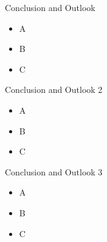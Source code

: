 \begin{frame}{Conclusion and Outlook}
    \begin{itemize}
        \item A
        \item B
        \item C
    \end{itemize}
\end{frame}

\begin{frame}{Conclusion and Outlook 2}
    \begin{itemize}
        \item A
        \item B
        \item C
    \end{itemize}
\end{frame}

\begin{frame}{Conclusion and Outlook 3}
    \begin{itemize}
        \item A
        \item B
        \item C
    \end{itemize}
\end{frame}